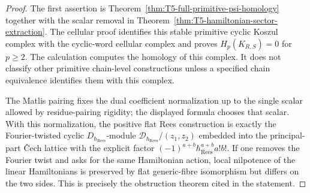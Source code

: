 \begin{proof}
  The first assertion is Theorem~\ref{thm:T5-full-primitive-psi-homology}
  together with the scalar removal in
  Theorem~\ref{thm:T5-hamiltonian-sector-extraction}.  The cellular proof
  identifies this stable primitive cyclic Koszul complex with the
	  cyclic-word cellular complex and proves \(H_p(K_{R,S})=0\) for \(p\ge2\).
  The calculation computes the homology of this complex.  It does not
  classify other primitive chain-level constructions unless a specified
  chain equivalence identifies them with this complex.

  The Matlis pairing fixes the dual coefficient normalization up to the
  single scalar allowed by residue-pairing rigidity; the displayed formula
  chooses that scalar.  With this normalization, the positive flat Rees
  construction is exactly the Fourier-twisted cyclic
  \(D_{\hbar_{\mathrm{Rees}}}\)-module
  \(\mathcal D_{\hbar_{\mathrm{Rees}}}/(z_1,z_2)\) embedded into the principal-part \v{C}ech
  lattice with the explicit factor
  \((-1)^{a+b}\hbar_{\mathrm{Rees}}^{a+b}a!b!\).  If one removes the Fourier twist and asks
  for the same Hamiltonian action, local nilpotence of the linear
  Hamiltonians is preserved by flat generic-fibre isomorphism but differs
  on the two sides.  This is precisely the obstruction theorem cited in
  the statement.
\end{proof}

